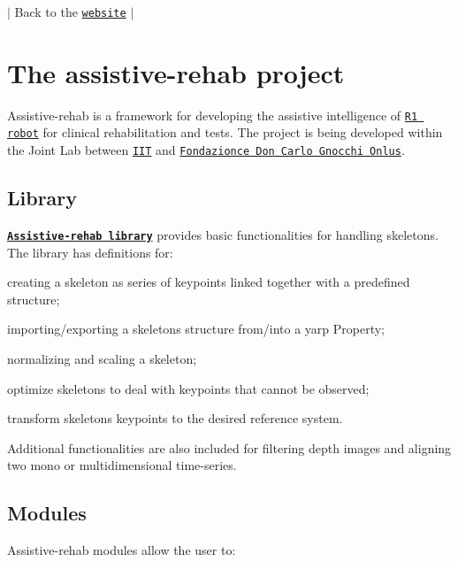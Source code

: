 $\vert$ Back to the \href{https://robotology.github.io/assistive-rehab/doc/mkdocs/site/index.html}{\tt website} $\vert$

\section*{The assistive-\/rehab project}

Assistive-\/rehab is a framework for developing the assistive intelligence of \href{https://www.youtube.com/watch?v=TBphNGW6m4o}{\tt R1 robot} for clinical rehabilitation and tests. The project is being developed within the Joint Lab between \href{https://www.iit.it}{\tt I\+IT} and \href{https://www.dongnocchi.it}{\tt Fondazionce Don Carlo Gnocchi Onlus}.

\subsection*{Library}

\href{https://robotology.github.io/assistive-rehab/doc/doxygen/doc/html/group__skeleton.html}{\tt {\bfseries {\ttfamily Assistive-\/rehab library}}} provides basic functionalities for handling skeletons. The library has definitions for\+:


\begin{DoxyItemize}
\item creating a skeleton as series of keypoints linked together with a predefined structure;
\item importing/exporting a skeleton\textquotesingle{}s structure from/into a yarp Property;
\item normalizing and scaling a skeleton;
\item optimize skeletons to deal with keypoints that cannot be observed;
\item transform skeleton\textquotesingle{}s keypoints to the desired reference system.
\end{DoxyItemize}

Additional functionalities are also included for filtering depth images and aligning two mono or multidimensional time-\/series.

\subsection*{Modules}

Assistive-\/rehab modules allow the user to\+:


